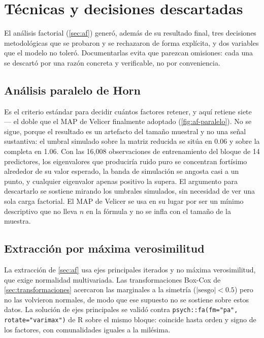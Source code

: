 \section{Técnicas y decisiones descartadas}\label{sec:tecnicas-descartadas}

El análisis factorial (\cref{sec:af}) generó, además de su resultado final,
tres decisiones metodológicas que se probaron y se rechazaron de forma
explícita, y dos variables que el modelo no toleró. Documentarlas evita que
parezcan omisiones: cada una se descartó por una razón concreta y verificable,
no por conveniencia.

\subsection{Análisis paralelo de Horn}

Es el criterio estándar para decidir cuántos factores retener, y aquí retiene
siete --- el doble que el MAP de Velicer finalmente adoptado
(\cref{fig:af-paralelo}). No se sigue, porque el resultado es un artefacto del
tamaño muestral y no una señal sustantiva: el umbral simulado sobre la matriz
reducida se sitúa en 0.06 y sobre la completa en 1.06. Con las 16,008
observaciones de entrenamiento del bloque de 14 predictores, los eigenvalores que produciría ruido puro se concentran
fortísimo alrededor de su valor esperado, la banda de simulación se angosta
casi a un punto, y cualquier eigenvalor apenas positivo la supera. El
argumento para descartarlo se sostiene mirando los umbrales simulados, sin
necesidad de ver una sola carga factorial. El MAP de Velicer se usa en su
lugar por ser un mínimo descriptivo que no lleva $n$ en la fórmula y no se
infla con el tamaño de la muestra.

\subsection{Extracción por máxima verosimilitud}

La extracción de \cref{sec:af} usa ejes principales iterados y no máxima
verosimilitud, que exige normalidad multivariada. Las transformaciones
Box-Cox de \cref{sec:transformaciones} acercaron las marginales a la simetría
($|\text{sesgo}|<0.5$) pero no las volvieron normales, de modo que ese
supuesto no se sostiene sobre estos datos. La solución de ejes principales se
validó contra \texttt{psych::fa(fm="pa", rotate="varimax")} de R sobre el
mismo bloque: coincide hasta orden y signo de los factores, con comunalidades
iguales a la milésima.


